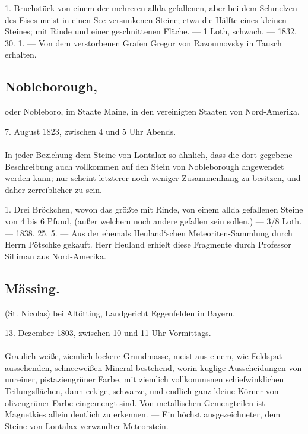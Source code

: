 \documentclass[a4paper, 11pt, oneside, polutonikogreek, german]{article}
\begin{document}
1. Bruchstück von einem der mehreren allda gefallenen, aber bei dem Schmelzen des Eises meist in einen See versunkenen Steine; etwa die Hälfte eines kleinen Steines; mit Rinde und einer geschnittenen Fläche. — 1 Loth, schwach. — 1832. 30. 1. — Von dem verstorbenen Grafen Gregor von Razoumovsky in Tausch erhalten.
\subsection[Nobleborough.]{Nobleborough,}
\begin{center}
\small
oder Nobleboro, im Staate Maine, in den vereinigten Staaten von Nord-Amerika.

7. August 1823, zwischen 4 und 5 Uhr Abends.
\end{center}
\paragraph{}
In jeder Beziehung dem Steine von Lontalax so ähnlich, dass die dort gegebene Beschreibung auch vollkommen auf den Stein von Nobleborough angewendet werden kann; nur scheint letzterer noch weniger Zusammenhang zu besitzen, und daher zerreiblicher zu sein.

1. Drei Bröckchen, wovon das größte mit Rinde, von einem allda gefallenen Steine von 4 bis 6 Pfund, (außer welchem noch andere gefallen sein sollen.) — 3/8 Loth. — 1838. 25. 5. — Aus der ehemals Heuland‘schen Meteoriten-Sammlung durch Herrn Pötschke gekauft. Herr Heuland erhielt diese Fragmente durch Professor Silliman aus Nord-Amerika.
\subsection{Mässing.}
\begin{center}
\small
(St. Nicolas) bei Altötting, Landgericht Eggenfelden in Bayern.

13. Dezember 1803, zwischen 10 und 11 Uhr Vormittags.
\end{center}
\paragraph{}
Graulich weiße, ziemlich lockere Grundmasse, meist aus einem, wie Feldspat aussehenden, schneeweißen Mineral bestehend‚ worin kuglige Ausscheidungen von unreiner, pistaziengrüner Farbe, mit ziemlich vollkommenen schiefwinklichen Teilungsflächen, dann eckige, schwarze, und endlich ganz kleine Körner von olivengrüner Farbe eingemengt sind. Von metallischen Gemengteilen ist Magnetkies allein deutlich zu erkennen. — Ein höchst ausgezeichneter, dem Steine von Lontalax verwandter Meteorstein.
\end{document}
